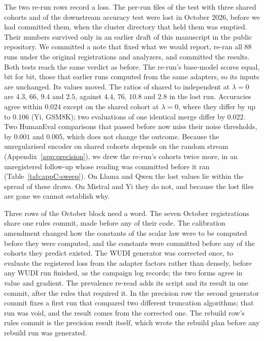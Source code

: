 The two re-run rows record a loss. The per-run files of the test with three
shared cohorts and of the downstream accuracy test were lost in October 2026,
before we had committed them, when the cluster directory that held them was
emptied. Their numbers survived only in an earlier draft of this manuscript in
the public repository. We committed a note that fixed what we would report,
re-ran all $88$ runs under the original registrations and analyzers, and
committed the results. Both tests reach the same verdict as before. The
re-run's base-model scores equal, bit for bit, those that earlier runs
computed from the same adapters, so its inputs are unchanged. Its values
moved. The ratios of shared to independent at $\lambda = 0$ are
$4.3$, $66$, $9.4$ and $2.5$, against $4.4$, $76$, $10.8$ and $2.8$ in the
lost run. Accuracies agree within $0.024$ except on the shared cohort at
$\lambda = 0$, where they differ by up to $0.106$ (Yi, GSM8K); two evaluations
of one identical merge differ by $0.022$. Two HumanEval comparisons that
passed before now miss their noise thresholds, by $0.001$ and $0.005$, which does not
change the outcome. Because the unregularised encoder on shared cohorts
depends on the random stream (Appendix~\ref{app:precision}), we drew the re-run's
cohorts twice more, in an unregistered follow-up whose reading was committed
before it ran (Table~\ref{tab:appC-sweep}). On Llama and Qwen the lost
values lie within the spread of these draws. On Mistral and Yi they do not,
and because the lost files are gone we cannot establish why.

Three rows of the October block need a word. The seven October registrations
share one rules commit, made before any of their code. The calibration
amendment changed how the constants of the scalar law were to be computed
before they were computed, and the constants were committed before any of the
cohorts they predict existed. The WUDI generator was corrected once, to
evaluate the registered loss from the adapter factors rather than densely,
before any WUDI run finished, as the campaign log records; the two forms agree
in value and gradient. The
prevalence re-read adds its script and its result in one commit, after the
rules that required it. In the precision row the second generator commit fixes
a first run that compared two different truncation algorithms; that run was
void, and the result comes from the corrected one. The rebuild row's rules
commit is the precision result itself, which wrote the rebuild plan before any
rebuild run was generated.

